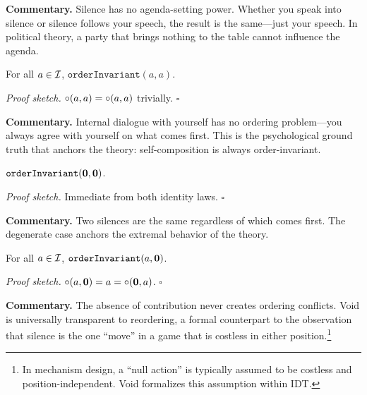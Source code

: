 \noindent\textbf{Commentary.}
Silence has no agenda-setting power.  Whether you speak into silence or
silence follows your speech, the result is the same---just your speech.
In political theory, a party that brings nothing to the table cannot
influence the agenda.

\begin{theorem}
\label{thm:self_order_invariant}
For all $a \in \mathcal{I}$, $\texttt{orderInvariant}(a, a)$.
\end{theorem}

\noindent\textit{Proof sketch.}\quad
$\circ(a, a) = \circ(a, a)$ trivially.
\hfill$\square$

\medskip

\noindent\textbf{Commentary.}
Internal dialogue with yourself has no ordering problem---you always agree
with yourself on what comes first.  This is the psychological ground truth
that anchors the theory: self-composition is always order-invariant.

\begin{theorem}
\label{thm:void_void_invariant}
$\texttt{orderInvariant}(\mathbf{0}, \mathbf{0})$.
\end{theorem}

\noindent\textit{Proof sketch.}\quad
Immediate from both identity laws. \hfill$\square$

\medskip

\noindent\textbf{Commentary.}
Two silences are the same regardless of which comes first.  The degenerate
case anchors the extremal behavior of the theory.

\begin{theorem}
\label{thm:void_universal_order_invariant}
For all $a \in \mathcal{I}$, $\texttt{orderInvariant}(a, \mathbf{0})$.
\end{theorem}

\noindent\textit{Proof sketch.}\quad
$\circ(a, \mathbf{0}) = a = \circ(\mathbf{0}, a)$.
\hfill$\square$

\medskip

\noindent\textbf{Commentary.}
The absence of contribution never creates ordering conflicts.  Void is
universally transparent to reordering, a formal counterpart to the
observation that silence is the one ``move'' in a game that is costless
in either position.\footnote{In mechanism design, a ``null action'' is
typically assumed to be costless and position-independent. Void formalizes
this assumption within IDT.}

